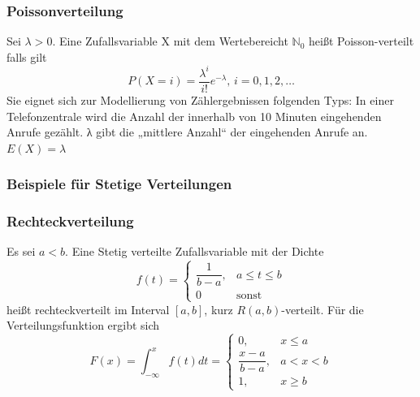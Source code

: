 \documentclass[
	ngerman,
	accentcolor=9c,%
	type=intern,
	marginpar=false
	]{tudapub}
\begin{document}
                \subsubsection*{Poissonverteilung}
                    Sei $\lambda > 0$.
                    Eine Zufallsvariable X mit dem Wertebereicht $\mathbb{N}_0$ heißt Poisson-verteilt falls gilt
                    \begin{equation*}
                        P(X=i) = \dfrac{\lambda^i}{i!}e^{-\lambda} \mbox{, } i = 0,1,2,\dots
                    \end{equation*}
                    Sie eignet sich zur Modellierung von Zählergebnissen folgenden Typs: In einer Telefonzentrale
                    wird die Anzahl der innerhalb von 10 Minuten eingehenden Anrufe gezählt. λ gibt die „mittlere
                    Anzahl“ der eingehenden Anrufe an.\\
                    $E(X) = \lambda$
            \subsubsection{Beispiele für Stetige Verteilungen}
                \subsubsection*{Rechteckverteilung}
                    Es sei $a<b$. Eine Stetig verteilte Zufallsvariable mit der Dichte
                    \begin{equation*}
                        f(t)=
                        \begin{cases}
                            \dfrac{1}{b-a}, & a\leq t \leq b\\
                            0 & \text{sonst}
                        \end{cases}
                    \end{equation*}
                    heißt rechteckverteilt im Interval $[a,b]$, kurz $R(a,b)$-verteilt. Für die Verteilungsfunktion ergibt sich
                    \begin{equation*}
                        F(x)=\int_{- \infty}^x f(t) dt=
                        \begin{cases}
                            0, & x\leq a\\
                            \dfrac{x-a}{b-a}, & a < x < b\\
                            1,& x \geq b 
                        \end{cases}
                    \end{equation*}
\end{document}

